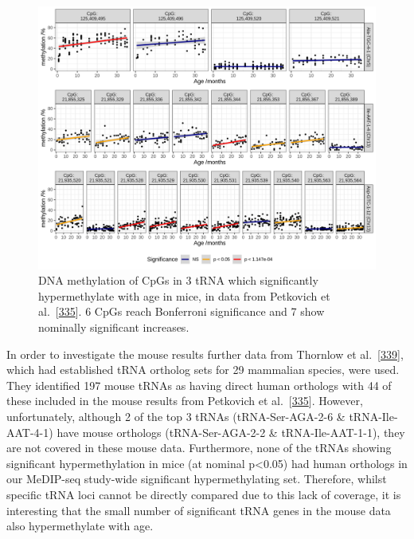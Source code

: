 \documentclass[
]{book}
\begin{document}
\begin{figure}

{\centering \includegraphics[width=1\linewidth]{./figs/CpGPlotComb} 

}

\caption{DNA methylation of CpGs in 3 tRNA which significantly hypermethylate with age in mice, in data from Petkovich et al.~{[}\protect\hyperlink{ref-Petkovich2017}{335}{]}. 6 CpGs reach Bonferroni significance and 7 show nominally significant increases.}\label{fig:mouse}
\end{figure}



In order to investigate the mouse results further data from Thornlow et al.~{[}\protect\hyperlink{ref-Thornlow2020}{339}{]}, which had established tRNA ortholog sets for 29 mammalian species, were used.
They identified 197 mouse tRNAs as having direct human orthologs with 44 of these included in the mouse results from Petkovich et al.~{[}\protect\hyperlink{ref-Petkovich2017}{335}{]}.
However, unfortunately, although 2 of the top 3 tRNAs (tRNA-Ser-AGA-2-6 \& tRNA-Ile-AAT-4-1) have mouse orthologs (tRNA-Ser-AGA-2-2 \& tRNA-Ile-AAT-1-1), they are not covered in these mouse data.
Furthermore, none of the tRNAs showing significant hypermethylation in mice (at nominal p\textless0.05) had human orthologs in our MeDIP-seq study-wide significant hypermethylating set.
Therefore, whilst specific tRNA loci cannot be directly compared due to this lack of coverage, it is interesting that the small number of significant tRNA genes in the mouse data also hypermethylate with age.
\end{document}
